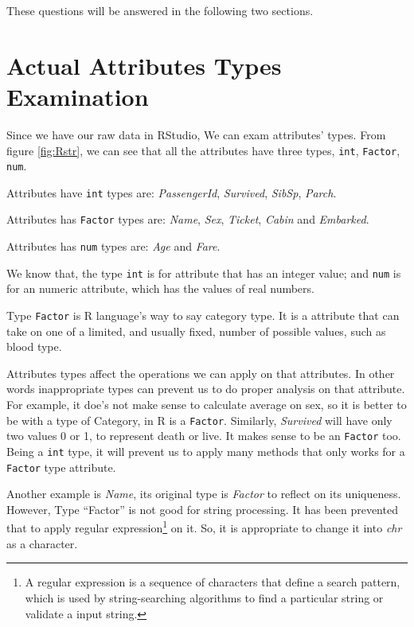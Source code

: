 \documentclass[
]{book}
\begin{document}
These questions will be answered in the following two sections.

\hypertarget{actual-attributes-types-examination}{%
\section{Actual Attributes Types Examination}\label{actual-attributes-types-examination}}

Since we have our raw data in RStudio, We can exam attributes' types. From figure \ref{fig:Rstr}, we can see that all the attributes have three types, \texttt{int}, \texttt{Factor}, \texttt{num}.

Attributes have \texttt{int} types are: \emph{PassengerId}, \emph{Survived}, \emph{SibSp}, \emph{Parch}.

Attributes has \texttt{Factor} types are: \emph{Name}, \emph{Sex}, \emph{Ticket}, \emph{Cabin} and \emph{Embarked}.

Attributes has \texttt{num} types are: \emph{Age} and \emph{Fare}.

We know that, the type \texttt{int} is for attribute that has an integer value; and \texttt{num} is for an numeric attribute, which has the values of real numbers.

Type \texttt{Factor} is R language's way to say category type. It is a attribute that can take on one of a limited, and usually fixed, number of possible values, such as blood type.

Attributes types affect the operations we can apply on that attributes. In other words inappropriate types can prevent us to do proper analysis on that attribute. For example, it doe's not make sense to calculate average on sex, so it is better to be with a type of Category, in R is a \texttt{Factor}. Similarly, \emph{Survived} will have only two values 0 or 1, to represent death or live. It makes sense to be an \texttt{Factor} too. Being a \texttt{int} type, it will prevent us to apply many methods that only works for a \texttt{Factor} type attribute.

Another example is \emph{Name}, its original type is \emph{Factor} to reflect on its uniqueness. However, Type ``Factor'' is not good for string processing. It has been prevented that to apply regular expression\footnote{A regular expression is a sequence of characters that define a search pattern, which is used by string-searching algorithms to find a particular string or validate a input string.} on it. So, it is appropriate to change it into \emph{chr} as a character.
\end{document}
